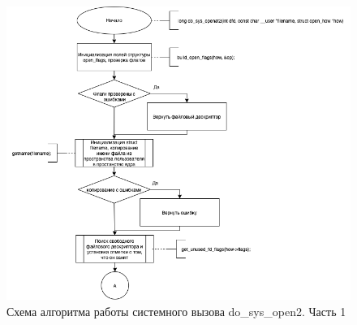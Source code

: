 \documentclass[12pt]{report}
\begin{document}
\begin{figure}[h!]
            \centering
            \includegraphics[scale=0.7]{do_sys_open_1.png}
            \caption{Схема алгоритма работы системного вызова do\_sys\_open2. Часть 1}
            \label{png:testing:result}
\end{figure}
\end{document}
